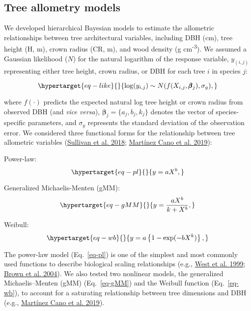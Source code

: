 \documentclass[
  12pt,
  letterpaper,
  DIV=11,
  numbers=noendperiod]{scrartcl}
\begin{document}
\hypertarget{tree-allometry-models}{%
\subsection{Tree allometry models}\label{tree-allometry-models}}

We developed hierarchical Bayesian models to estimate the allometric
relationships between tree architectural variables, including DBH (cm),
tree height (H, m), crown radius (CR, m), and wood density (g
cm\textsuperscript{-3}). We assumed a Gaussian likelihood (\(N\)) for
the natural logarithm of the response variable, \(y_{(i,j)}\)
representing either tree height, crown radius, or DBH for each tree
\(i\) in species \(j\):

\begin{equation}\protect\hypertarget{eq-like}{}{
\log(y_{i,j}) \sim N(f(X_{i,j}, \pmb{\beta}_{j}), \sigma_y),
}\label{eq-like}\end{equation}

where \(f(\cdot)\) predicts the expected natural log tree height or
crown radius from observed DBH (and \emph{vice versa}),
\(\pmb{\beta}_{j}=\{a_j, b_j, k_j\}\) denotes the vector of
species-specific parameters, and \(\sigma_y\) represents the standard
deviation of the observation error. We considered three functional forms
for the relationship between tree allometric variables
(\protect\hyperlink{ref-Sullivan2018}{Sullivan et al. 2018};
\protect\hyperlink{ref-MartinezCano2019}{Martínez Cano et al. 2019}):

Power-law: \begin{equation}\protect\hypertarget{eq-pl}{}{
y = aX^b,
}\label{eq-pl}\end{equation}

Generalized Michaelis-Menten (gMM):
\begin{equation}\protect\hypertarget{eq-gMM}{}{
y = \frac{aX^b}{k + X^b},
}\label{eq-gMM}\end{equation}

Weibull: \begin{equation}\protect\hypertarget{eq-wb}{}{
y = a\left\{1-\mathrm{exp}(-bX^k)\right\},
}\label{eq-wb}\end{equation}

The power-law model (Eq.~\ref{eq-pl}) is one of the simplest and most
commonly used functions to describe biological scaling relationships
(e.g., \protect\hyperlink{ref-West1999}{West et al. 1999};
\protect\hyperlink{ref-Brown2004}{Brown et al. 2004}). We also tested
two nonlinear models, the generalized Michaelis--Menten (gMM)
(Eq.~\ref{eq-gMM}) and the Weibull function (Eq.~\ref{eq-wb}), to
account for a saturating relationship between tree dimensions and DBH
(e.g., \protect\hyperlink{ref-MartinezCano2019}{Martínez Cano et al.
2019}).
\end{document}
